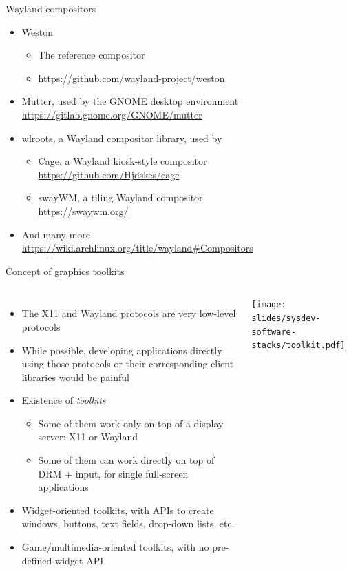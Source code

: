 \begin{frame}{Wayland compositors}
  \begin{itemize}
  \item Weston
    \begin{itemize}
    \item The reference compositor
    \item \url{https://github.com/wayland-project/weston}
    \end{itemize}
  \item Mutter, used by the GNOME desktop environment\\
    \url{https://gitlab.gnome.org/GNOME/mutter}
  \item wlroots, a Wayland compositor library, used by
    \begin{itemize}
    \item Cage, a Wayland kiosk-style compositor\\
      \url{https://github.com/Hjdskes/cage}
    \item swayWM, a tiling Wayland compositor\\
      \url{https://swaywm.org/}
    \end{itemize}
  \item And many more\\
    \url{https://wiki.archlinux.org/title/wayland\#Compositors}
  \end{itemize}
\end{frame}

\begin{frame}{Concept of graphics toolkits}
  \begin{columns}
    \begin{itemize}
    \item The X11 and Wayland protocols are very low-level protocols
    \item While possible, developing applications directly using those
      protocols or their corresponding client libraries would be painful
    \item Existence of {\em toolkits}
      \begin{itemize}
      \item Some of them work only on top of a display server: X11 or
        Wayland
      \item Some of them can work directly on top of DRM + input, for
        single full-screen applications
      \end{itemize}
    \item Widget-oriented toolkits, with APIs to create windows,
      buttons, text fields, drop-down lists, etc.
    \item Game/multimedia-oriented toolkits, with no pre-defined widget
      API
    \end{itemize}
    \begin{center}
      \texttt{[image: slides/sysdev-software-stacks/toolkit.pdf]}
    \end{center}
  \end{columns}
\end{frame}

